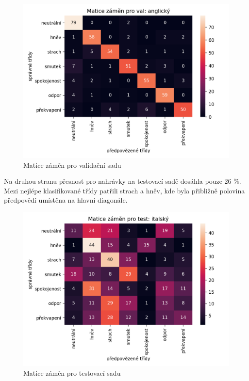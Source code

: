 \documentclass[FM,BP]{tulthesis}
\begin{document}
\begin{figure}[!htbp]
\centerline{\includegraphics[scale=.5]{baseline-conf_matrix-val.png}}
\caption{Matice záměn pro validační sadu}
\label{fig}
\end{figure}
\FloatBarrier

Na druhou stranu přesnost pro nahrávky na testovací sadě dosáhla pouze 26 \%. Mezi nejlépe klasifikované třídy patřili strach a hněv, kde byla přibližně polovina předpovědí umístěna na hlavní diagonále.

\begin{figure}[!htbp]
\centerline{\includegraphics[scale=.5]{baseline-conf_matrix-test.png}}
\caption{Matice záměn pro testovací sadu}
\label{fig}
\end{figure}
\FloatBarrier
\end{document}
